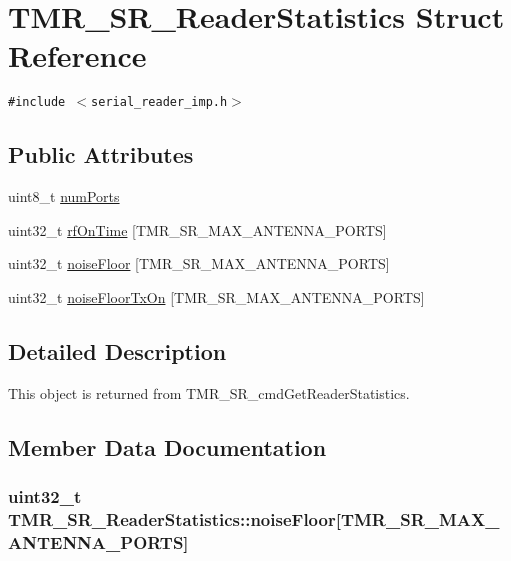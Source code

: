 \hypertarget{struct_t_m_r___s_r___reader_statistics}{
\section{TMR\_\-SR\_\-ReaderStatistics Struct Reference}
\label{struct_t_m_r___s_r___reader_statistics}
}
{\tt \#include $<$serial\_\-reader\_\-imp.h$>$}

\subsection*{Public Attributes}
\begin{CompactItemize}
\item 
uint8\_\-t \hyperlink{struct_t_m_r___s_r___reader_statistics_22c448dde1976203d18eb8763d8d45a8}{numPorts}
\item 
uint32\_\-t \hyperlink{struct_t_m_r___s_r___reader_statistics_2e98e3d9c3824e31751cd0557b8cf00f}{rfOnTime} \mbox{[}TMR\_\-SR\_\-MAX\_\-ANTENNA\_\-PORTS\mbox{]}
\item 
uint32\_\-t \hyperlink{struct_t_m_r___s_r___reader_statistics_f025793aa8693a7ef2eecd196704a4bc}{noiseFloor} \mbox{[}TMR\_\-SR\_\-MAX\_\-ANTENNA\_\-PORTS\mbox{]}
\item 
uint32\_\-t \hyperlink{struct_t_m_r___s_r___reader_statistics_27a2b6415c327b52ce2c8628fe1a8632}{noiseFloorTxOn} \mbox{[}TMR\_\-SR\_\-MAX\_\-ANTENNA\_\-PORTS\mbox{]}
\end{CompactItemize}


\subsection{Detailed Description}
This object is returned from TMR\_\-SR\_\-cmdGetReaderStatistics. 

\subsection{Member Data Documentation}
\hypertarget{struct_t_m_r___s_r___reader_statistics_f025793aa8693a7ef2eecd196704a4bc}{
\subsubsection[{noiseFloor}]{\setlength{\rightskip}{0pt plus 5cm}uint32\_\-t {\bf TMR\_\-SR\_\-ReaderStatistics::noiseFloor}\mbox{[}TMR\_\-SR\_\-MAX\_\-ANTENNA\_\-PORTS\mbox{]}}}
\label{struct_t_m_r___s_r___reader_statistics_f025793aa8693a7ef2eecd196704a4bc}


